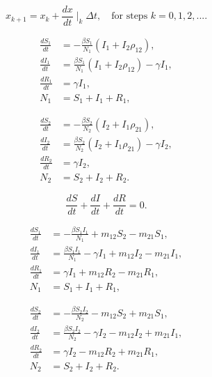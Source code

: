 \documentclass[14pt]{extarticle}
\begin{document}
	\newpage
	
	
	\begin{equation*}
		x_{k+1} = x_{k} + \frac{dx}{dt}\mid_{k} \Delta t, \quad\text{for steps $k=0,1,2,...$}.
	\end{equation*}
	
	
	\newpage
	
	
		\begin{align*}
	\frac{dS_1}{dt} &= -\frac{\beta S_1}{N_1}(I_1+I_2\rho_{12}),\\[0.5em]
	\frac{dI_1}{dt} &= \frac{\beta S_1}{N_1}(I_1+I_2\rho_{12}) - \gamma I_1,\\[0.5em]
	\frac{dR_1}{dt} &= \gamma I_1, \\[0.5em]
	N_1 &= S_1 + I_1 + R_1,
	\end{align*}
	
	\begin{align*}
	\frac{dS_2}{dt} &= -\frac{\beta S_2}{N_2}(I_2+I_1\rho_{21}),\\[0.5em]
	\frac{dI_2}{dt} &= \frac{\beta S_2}{N_2}(I_2+I_1\rho_{21}) - \gamma I_2,\\[0.5em]
	\frac{dR_2}{dt} &= \gamma I_2, \\[0.5em]
	N_2 &= S_2 + I_2 + R_2.
	\end{align*}
	
	\begin{equation*}
	\frac{dS}{dt} + \frac{dI}{dt} + \frac{dR}{dt} = 0.
	\end{equation*}
	
	
	\newpage
	
	
	
	\begin{align*}
	\frac{dS_1}{dt} &= -\frac{\beta S_1I_1}{N_1} + m_{12}S_2 - m_{21}S_1,\\[0.5em]
	\frac{dI_1}{dt} &= \frac{\beta S_1I_1}{N_1} - \gamma I_1  + m_{12}I_2 - m_{21}I_1,\\[0.5em]
	\frac{dR_1}{dt} &= \gamma I_1  + m_{12}R_2 - m_{21}R_1, \\[0.5em]
	N_1 &= S_1 + I_1 + R_1,
	\end{align*}
	
	\begin{align*}
	\frac{dS_2}{dt} &= -\frac{\beta S_2I_2}{N_2} - m_{12}S_2 + m_{21}S_1,\\[0.5em]
	\frac{dI_2}{dt} &= \frac{\beta S_2I_2}{N_2} - \gamma I_2 - m_{12}I_2 + m_{21}I_1,\\[0.5em]
	\frac{dR_2}{dt} &= \gamma I_2 - m_{12}R_2 + m_{21}R_1, \\[0.5em]
	N_2 &= S_2 + I_2 + R_2.
	\end{align*}	
	
\end{document}
